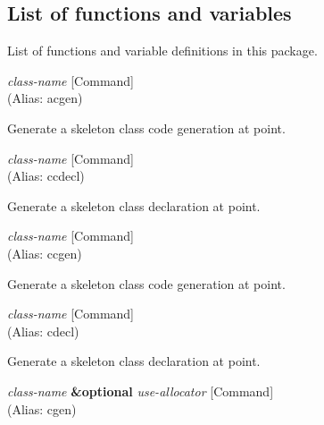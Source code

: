 \subsection{List of functions and variables}

List of functions and variable definitions in this package.



\vspace{1em}
\noindent
{}
\usebox{\funcname}\emph{class-name}
 \hfill [Command]\\%
 (Alias: acgen)

\begin{doc-string}
Generate a skeleton class code generation at point.
\end{doc-string}

\vspace{1em}
\noindent
{}
\usebox{\funcname}\emph{class-name}
 \hfill [Command]\\%
 (Alias: ccdecl)

\begin{doc-string}
Generate a skeleton class declaration at point.
\end{doc-string}

\vspace{1em}
\noindent
{}
\usebox{\funcname}\emph{class-name}
 \hfill [Command]\\%
 (Alias: ccgen)

\begin{doc-string}
Generate a skeleton class code generation at point.
\end{doc-string}

\vspace{1em}
\noindent
{}
\usebox{\funcname}\emph{class-name}
 \hfill [Command]\\%
 (Alias: cdecl)

\begin{doc-string}
Generate a skeleton class declaration at point.
\end{doc-string}

\vspace{1em}
\noindent
{}
\usebox{\funcname}\emph{class-name} \textbf{\&optional} \emph{use-allocator}
 \hfill [Command]\\%
 (Alias: cgen)

